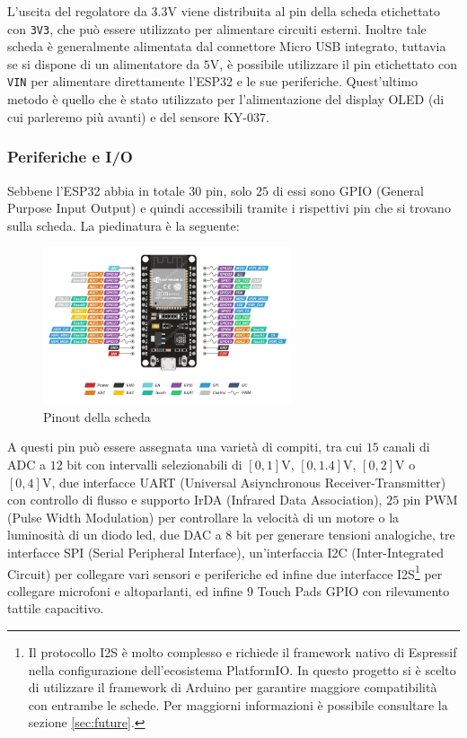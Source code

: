 \documentclass[a4paper,12pt]{report}  %
\newcommand{\lstinlinebg}[1]{\colorbox{backcolour}{\lstinline|#1|}}
\begin{document}
L'uscita del regolatore da $3.3 \text{V}$ viene distribuita al pin della scheda etichettato con \lstinlinebg{3V3}, che può essere utilizzato per alimentare circuiti esterni.
Inoltre tale scheda è generalmente alimentata dal connettore Micro USB integrato, tuttavia se si dispone di un alimentatore da $5 \text{V}$, è possibile utilizzare il pin etichettato con \lstinlinebg{VIN} per alimentare direttamente l'ESP32 e le sue periferiche.
Quest'ultimo metodo è quello che è stato utilizzato per l'alimentazione del display OLED (di cui parleremo più avanti) e del sensore KY-037.

\subsubsection{Periferiche e I/O}
Sebbene l'ESP32 abbia in totale $30$ pin, solo $25$ di essi sono GPIO (General Purpose Input Output) e quindi accessibili tramite i rispettivi pin che si trovano sulla scheda.
La piedinatura è la seguente:

\begin{figure}[h]
    \centering
    \includegraphics[width=0.65\textwidth]{imgs/pinout.png}
    \caption{Pinout della scheda}
    \label{fig:ESP32-pinout}
\end{figure}

A questi pin può essere assegnata una varietà di compiti, tra cui $15$ canali di ADC a $12$ bit con intervalli selezionabili di $[0, 1] \text{V}$, $[0, 1.4] \text{V}$, $[0, 2] \text{V}$ o $[0, 4] \text{V}$, due interfacce UART (Universal Asiynchronous Receiver-Transmitter) con controllo di flusso e supporto IrDA (Infrared Data Association), $25$ pin PWM (Pulse Width Modulation) per controllare la velocità di un motore o la luminosità di un diodo led, due DAC a $8$ bit per generare tensioni analogiche, tre interfacce SPI (Serial Peripheral Interface), un'interfaccia I2C (Inter-Integrated Circuit) per collegare vari sensori e periferiche ed infine due interfacce I2S\footnote{Il protocollo I2S è molto complesso e richiede il framework nativo di Espressif nella configurazione dell'ecosistema PlatformIO. In questo progetto si è scelto di utilizzare il framework di Arduino per garantire maggiore compatibilità con entrambe le schede. Per maggiorni informazioni è possibile consultare la sezione \ref{sec:future}.} per collegare microfoni e altoparlanti, ed infine $9$ Touch Pads GPIO con rilevamento tattile capacitivo.
\end{document}

